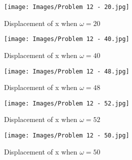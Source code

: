 \documentclass[]{book}
\theoremstyle{definition}
\begin{document}
\begin{enumerate}
\begin{figure}[htbp]
    \centering
    \texttt{[image: Images/Problem 12 - 20.jpg]}
    \caption{Displacement of x when $\omega = 20$}
\end{figure}
\begin{figure}[htbp]
    \centering
    \texttt{[image: Images/Problem 12 - 40.jpg]}
    \caption{Displacement of x when $\omega = 40$}
\end{figure}
\begin{figure}[htbp]
    \centering
    \texttt{[image: Images/Problem 12 - 48.jpg]}
    \caption{Displacement of x when $\omega = 48$}
\end{figure}
\begin{figure}[htbp]
    \centering
    \texttt{[image: Images/Problem 12 - 52.jpg]}
    \caption{Displacement of x when $\omega = 52$}
\end{figure}
\begin{figure}[t]
    \centering
    \texttt{[image: Images/Problem 12 - 50.jpg]}
    \caption{Displacement of x when $\omega = 50$}
\end{figure}
\end{enumerate}
\end{document}
